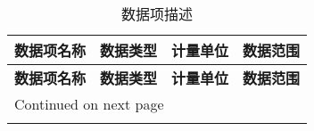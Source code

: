 \begin{longtable}{p{3.5cm}llp{4cm}} 
        \caption{数据项描述} \\
        \hline 
        \multicolumn{1}{l}{\textbf{数据项名称}} & \multicolumn{1}{l}{\textbf{数据类型}} & \multicolumn{1}{l}{\textbf{计量单位}} & \multicolumn{1}{l}{\textbf{数据范围}}\\ 
        \hline 
        \endfirsthead
			
        \hline \multicolumn{1}{l}{\textbf{数据项名称}} & \multicolumn{1}{l}{\textbf{数据类型}} & \multicolumn{1}{l}{\textbf{计量单位}} & \multicolumn{1}{l}{\textbf{数据范围}}\\ \hline 
        \endhead
			
        \hline \multicolumn{4}{l}{{Continued on next page}} \\ 
        \endfoot
    			
        \hline
        \endlastfoot
        

\end{longtable}
